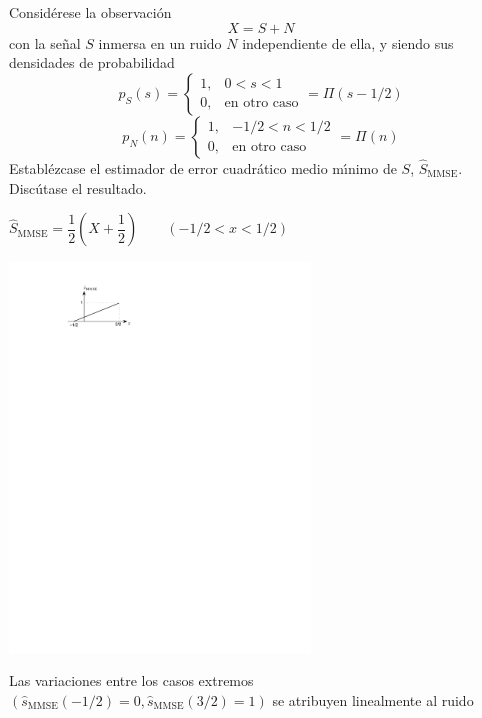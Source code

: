 \ifspanish

\question Consid\'{e}rese la observaci\'{o}n
			 $$ X = S + N  $$
con la se\~{n}al $S$ inmersa en un ruido $N$ independiente de ella, y siendo sus densidades de probabilidad 
		      $$p_S(s) =
			      \left\{\begin{array}{ll}
				  	\displaystyle
						  1, & 0<s<1 \\
						  0, & {\mbox{en otro caso}} 
 					 \end{array} 
				  \right. = \Pi (s - 1/2)
		      $$   
		      $$p_N(n) =
			      \left\{\begin{array}{ll}
				  	\displaystyle
						  1, & -1/2<n<1/2 \\
						  0, & {\mbox{en otro caso}} 
 					 \end{array} 
				  \right. = \Pi (n)
		      $$   
Establ\'{e}zcase el estimador de error cuadr\'{a}tico medio m\'{\i}nimo de $S$, $\hat{S}_\text{MMSE}$. Disc\'{u}tase el resultado.

\begin{solution}
   $\hat S_\text{MMSE} = \dfrac{1}{2} \left(X + \dfrac{1}{2}\right) \quad\quad (-1/2 < x <1/2) $       
   
   \includegraphics[width=8cm, trim=0 23cm 12cm 2cm]{Figuras/fig3E1}
   
   Las variaciones entre los casos extremos $(\hat{s}_\text{MMSE} (-1/2) = 0, \hat{s}_\text{MMSE} (3/2) = 1)$ se atribuyen linealmente al ruido
\end{solution}

\else

